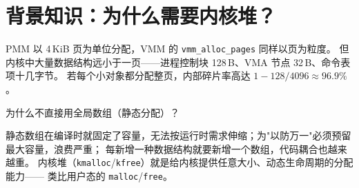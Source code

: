 \section{背景知识：为什么需要内核堆？}

PMM 以 4\,KiB 页为单位分配，VMM 的 \texttt{vmm\_alloc\_pages} 同样以页为粒度。
但内核中大量数据结构远小于一页——进程控制块 128\,B、VMA 节点 32\,B、命令表项十几字节。
若每个小对象都分配整页，内部碎片率高达 $1 - 128/4096 \approx 96.9\%$。

\begin{whybox}
为什么不直接用全局数组（静态分配）？

静态数组在编译时就固定了容量，无法按运行时需求伸缩；为"以防万一"必须预留最大容量，浪费严重；
每新增一种数据结构就要新增一个数组，代码耦合也越来越重。
内核堆（\texttt{kmalloc}/\texttt{kfree}）就是给内核提供任意大小、动态生命周期的分配能力——
类比用户态的 \texttt{malloc}/\texttt{free}。
\end{whybox}


